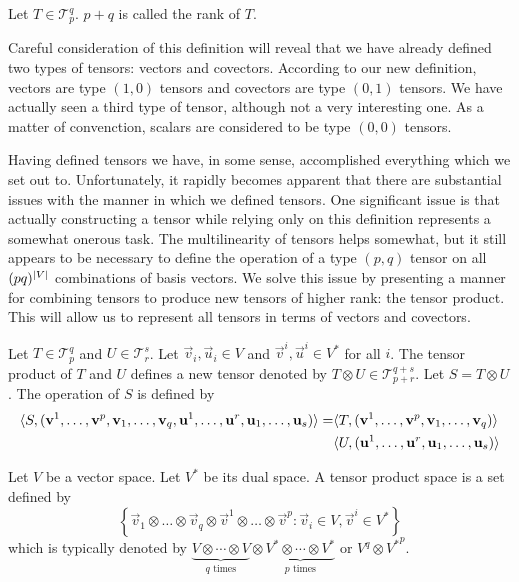 \documentclass[../main.tex]{subfiles}
\begin{document}
    \begin{definition}[Rank]
        Let \(T\in\mathcal{T}_{p}^{q}\). \(p+q\) is called the rank of \(T\).
    \end{definition}
    Careful consideration of this definition will reveal that we have already defined two types of tensors: vectors and covectors. According to our new definition, vectors are type \((1,0)\) tensors and covectors are type \((0,1)\) tensors. We have actually seen a third type of tensor, although not a very interesting one. As a matter of convenction, scalars are considered to be type \((0,0)\) tensors.
    
    Having defined tensors we have, in some sense, accomplished everything which we set out to. Unfortunately, it rapidly becomes apparent that there are substantial issues with the manner in which we defined tensors. One significant issue is that actually constructing a tensor while relying only on this definition represents a somewhat onerous task. The multilinearity of tensors helps somewhat, but it still appears to be necessary to define the operation of a type \((p,q)\) tensor on all \((pq)^{\lvert V\rvert}\) combinations of basis vectors. We solve this issue by presenting a manner for combining tensors to produce new tensors of higher rank: the tensor product. This will allow us to represent all tensors in terms of vectors and covectors.
    \begin{definition}
        Let \(T\in\mathcal{T}_{p}^{q}\) and \(U\in\mathcal{T}_{r}^{s}\). Let \(\vec{v}_{i},\vec{u}_{i}\in{}V\) and \(\vec{v}^{i},\vec{u}^{i}\in{}V^{*}\) for all \(i\). The tensor product of \(T\) and \(U\) defines a new tensor denoted by \(T\otimes{}U\in\mathcal{T}_{p+r}^{q+s}\). Let \(S=T\otimes{}U\). The operation of \(S\) is defined by
        \begin{align*}
            \langle S,(\mathbf{v}^{1},\dots,\mathbf{v}^{p},\mathbf{v}_{1},\dots,\mathbf{v}_{q},\mathbf{u}^{1},\dots,\mathbf{u}^{r},\mathbf{u}_{1},\dots,\mathbf{u}_{s})\rangle=&\langle T,(\mathbf{v}^{1},\dots,\mathbf{v}^{p},\mathbf{v}_{1},\dots,\mathbf{v}_{q})\rangle\\
                                                                                                                                               &\langle U,(\mathbf{u}^{1},\dots,\mathbf{u}^{r},\mathbf{u}_{1},\dots,\mathbf{u}_{s})\rangle
        \end{align*}
    \end{definition}
    \begin{definition}
        Let \(V\) be a vector space. Let \(V^{*}\) be its dual space. A tensor product space is a set defined by
        \begin{equation*}
            \left\{\vec{v}_1\otimes\dots\otimes{}\vec{v}_{q}\otimes\vec{v}^1\otimes\dots\otimes{}\vec{v}^{p}:\vec{v}_{i}\in{}V,\vec{v}^{i}\in{}V^{*}\right\}
        \end{equation*}
        which is typically denoted by \(\underbrace{V\otimes\cdots\otimes{}V}_{q\text{ times}}\otimes\underbrace{V^{*}\otimes\cdots\otimes{}V^{*}}_{p\text{ times}}\) or \(V^{q}\otimes{}{V^{*}}^{p}\).
    \end{definition}
\end{document}

